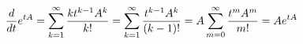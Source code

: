 \documentclass[preview]{standalone}
\begin{document}
\begin{align*}
\special{dvisvgm:raw <g id='unique000'>}\dfrac{d}{dt}e^{tA}=\displaystyle\sum_{k=1}^{\infty}\dfrac{kt^{k-1}A^k}{k!}=\sum_{k=1}^{\infty}\dfrac{t^{k-1}A^k}{(k-1)!}=A\sum_{m=0}^{\infty}\dfrac{t^mA^m}{m!}=Ae^{tA}\special{dvisvgm:raw </g>}
\end{align*}
\end{document}
